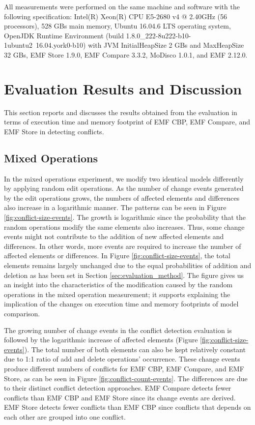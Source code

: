 All measurements were performed on the same machine and software with the following specification: Intel(R) Xeon(R) CPU E5-2680 v4 @ 2.40GHz (56 processors), 528 GBs main memory, Ubuntu 16.04.6 LTS operating system, OpenJDK Runtime Environment (build 1.8.0\_222-8u222-b10-1ubuntu2~16.04.york0-b10) with JVM \textsf{InitialHeapSize} 2 GBs and \textsf{MaxHeapSize} 32 GBs, EMF Store 1.9.0, EMF Compare 3.3.2, MoDisco 1.0.1, and EMF 2.12.0.

\section{Evaluation Results and Discussion}
\label{sec:evaluation_discussion}
This section reports and discusses the results obtained from the evaluation in terms of execution time and memory footprint of EMF CBP, EMF Compare, and EMF Store in detecting conflicts. 

\subsection{Mixed Operations}
\label{sec:mixed-operation_conflict}

In the mixed operations experiment, we modify two identical models differently by applying random edit operations. As the number of change events generated by the edit operations grows, the numbers of affected elements and differences also increase in a logarithmic manner. The patterns can be seen in Figure \ref{fig:conflict-size-events}. The growth is logarithmic since the probability that the random operations modify the same elements also increases. Thus, some change events might not contribute to the addition of new affected elements and differences. In other words, more events are required to increase the number of affected elements or differences. In Figure \ref{fig:conflict-size-events}, the total elements remains largely unchanged due to the equal probabilities of addition and deletion as has been set in Section \ref{sec:evaluation_method}. The figure gives us an insight into the characteristics of the modification caused by the random operations in the mixed operation measurement; it supports explaining the implication of the changes on execution time and memory footprints of model comparison.

The growing number of change events in the conflict detection evaluation is followed by the logarithmic increase of affected elements (Figure \ref{fig:conflict-size-events}). The total number of both elements can also be kept relatively constant due to 1:1 ratio of \textsf{add} and \textsf{delete} operations' occurrence. These change events produce different numbers of conflicts for EMF CBP, EMF Compare, and EMF Store, as can be seen in Figure \ref{fig:conflict-count-events}. The differences are due to their distinct conflict detection approaches. EMF Compare detects fewer conflicts than EMF CBP and EMF Store since its change events are derived. EMF Store detects fewer conflicts than EMF CBP since conflicts that depends on each other are grouped into one conflict.

